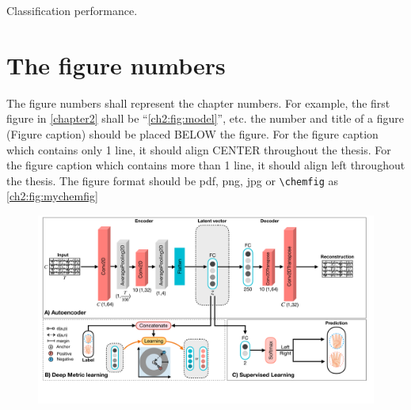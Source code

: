 \begin{table}[ht]
\caption{Classification performance.}
\label{ch2:table:results}
\centering
\normalsize\singlespacingplus

\end{table}





\section{The figure numbers}

\begin{paragraph}
The figure numbers shall represent the chapter numbers. For example, the first figure in \autoref{chapter2} shall be ``\autoref{ch2:fig:model}'', etc. the number and title of a figure (Figure caption) should be placed BELOW the figure. For the figure caption which contains only 1 line, it should align CENTER throughout the thesis. For the figure caption which contains more than 1 line, it should align left throughout the thesis. The figure format should be pdf, png, jpg or \lstinline[language=C]!\chemfig! as \autoref{ch2:fig:mychemfig}
\end{paragraph}


\begin{figure}[ht]
\centering
\includegraphics[width=1\columnwidth]{figures/ch3/model.pdf}
\label{ch2:fig:model}
\end{figure}


